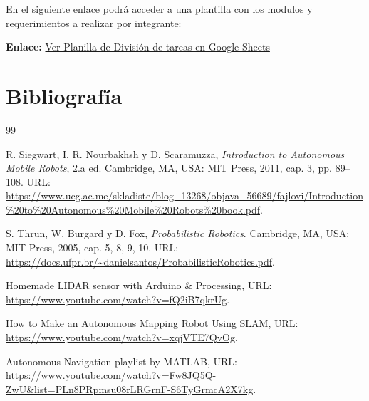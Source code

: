 \documentclass[12pt,a4paper]{article}
\begin{document}
\begin{tcolorbox}[colframe=green!60!black, colback=green!5!white, arc=2mm, title=\textbf{División de tareas (Google Sheets)}]
  En el siguiente enlace podrá acceder a una plantilla con los modulos y requerimientos a realizar por integrante:
  \vspace{0.2cm}

  \textbf{Enlace:} \href{https://docs.google.com/spreadsheets/d/1GAEeQZzlFaMgwrWLOeSPeK0nOuYQg2peXEuDazYDfk4/edit?usp=sharing}{Ver Planilla de División de tareas en Google Sheets}
\end{tcolorbox}

\section{Bibliografía}

\begin{thebibliography}{99}

R. Siegwart, I. R. Nourbakhsh y D. Scaramuzza,
\textit{Introduction to Autonomous Mobile Robots}, 2.a ed.
Cambridge, MA, USA: MIT Press, 2011, cap. 3, pp. 89--108.
URL: \url{https://www.ucg.ac.me/skladiste/blog_13268/objava_56689/fajlovi/Introduction%20to%20Autonomous%20Mobile%20Robots%20book.pdf}.

S. Thrun, W. Burgard y D. Fox,
\textit{Probabilistic Robotics}.
Cambridge, MA, USA: MIT Press, 2005, cap. 5, 8, 9, 10.
URL: \url{https://docs.ufpr.br/~danielsantos/ProbabilisticRobotics.pdf}.

Homemade LIDAR sensor with Arduino \& Processing,
URL: \url{https://www.youtube.com/watch?v=fQ2iB7qkrUg}.

How to Make an Autonomous Mapping Robot Using SLAM,
URL: \url{https://www.youtube.com/watch?v=xqjVTE7QvOg}.

Autonomous Navigation playlist by MATLAB,
URL: \url{https://www.youtube.com/watch?v=Fw8JQ5Q-ZwU&list=PLn8PRpmsu08rLRGrnF-S6TyGrmcA2X7kg}.



\end{thebibliography}
\end{document}
